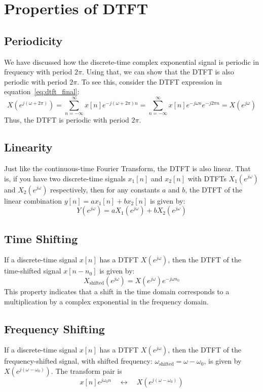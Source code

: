 \section{Properties of DTFT}
\subsection{Periodicity}
We have discussed how the discrete-time complex exponential signal is periodic in frequency with period \( 2\pi \). Using that, we can show that the DTFT is also periodic with period \( 2\pi \). To see this, consider the DTFT expression in equation~\eqref{eq:dtft_final}:
\[
X(e^{j (\omega + 2\pi)}) = \sum_{n=-\infty}^{\infty} x[n] e^{-j (\omega + 2\pi) n} = \sum_{n=-\infty}^{\infty} x[n] e^{-j \omega n} e^{-j 2\pi n} = X(e^{j \omega})
\] 
Thus, the DTFT is periodic with period \( 2\pi \).
\subsection{Linearity}
Just like the continuous-time Fourier Transform, the DTFT is also linear. That is, if you have two discrete-time signals \( x_1[n] \) and \( x_2[n] \) with DTFTs \( X_1(e^{j \omega}) \) and \( X_2(e^{j \omega}) \) respectively, then for any constants \( a \) and \( b \), the DTFT of the linear combination \( y[n] = a x_1[n] + b x_2[n] \) is given by:
\[Y(e^{j \omega}) = a X_1(e^{j \omega}) + b X_2(e^{j \omega})\]
\subsection{Time Shifting}
If a discrete-time signal \( x[n] \) has a DTFT \( X(e^{j \omega}) \), then the DTFT of the time-shifted signal \( x[n - n_0] \) is given by:
\[X_{\text{shifted}}(e^{j \omega}) = X(e^{j \omega}) e^{-j \omega n_0}\]
This property indicates that a shift in the time domain corresponds to a multiplication by a complex exponential in the frequency domain.
\subsection{Frequency Shifting}
If a discrete-time signal \( x[n] \) has a DTFT \( X(e^{j \omega}) \), then the DTFT of the frequency-shifted signal, with shifted frequency: $\omega_{\text{shifted}} = \omega - \omega_0$, is given by $X(e^{j (\omega - \omega_0)})$. The transform pair is
\[ x[n]e^{j\omega_0 n} \quad \longleftrightarrow \quad X(e^{j(\omega-\omega_0)}) \]
